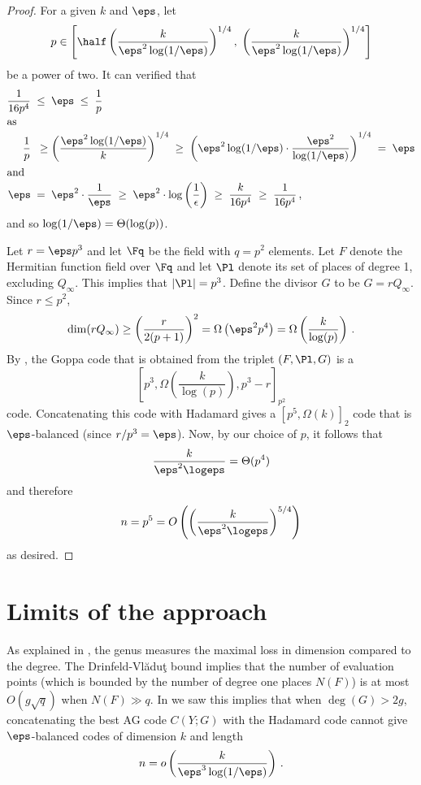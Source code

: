 \begin{proof}
For a given $k$ and $\eps$, let $$p \in \left[\half
\left(\frac{k}{\eps^2 \log(1/\eps)}\right)^{1/4}, \;
\left(\frac{k}{\eps^2 \log(1/\eps)}\right)^{1/4}\right]$$ be a power
of two. It can verified that 
\begin{align*}
\frac{1}{16p^4}\; &\le\; \eps \;\le\;
\frac{1}{p}\\
\intertext{as}
  \frac{1}{p} \;&\;\ge \left(\frac{\eps^2 \log(1/\eps)}{k}\right)^{1/4} \;\ge\;
\left(\eps^2 \log(1/\eps) \cdot \frac{\eps^2}{\log(1/\eps)}\right)^{1/4}
\;=\; \eps\\
\intertext{and}
  \eps \;&=\; \eps^2 \cdot \frac{1}{\eps} \;\ge\; \eps^2 \cdot \log\left(\frac{1}{\epsilon}\right)
\;\ge\; \frac{k}{16 p^4} \;\ge\; \frac{1}{16 p^4}\,,
\end{align*}
and so $\log(1/\eps) = \Theta(\log(p))$.
%
%
%
%
%
%
%

Let $r=\eps p^3$ and let $\Fq $ be the field with $q=p^2$ elements.
Let $F$ denote the Hermitian function field over $\Fq $ and let
$\Pl$ denote its set of places of degree 1, excluding $Q_\infty$.
This implies that $|\Pl| = p^3$. Define the divisor $G$ to be $G =
rQ_\infty$. Since $r \le p^2$,
$$\dim (r Q_\infty) \ge \left(\frac{r}{2(p+1)}\right)^2 = \Omega\left(\eps^2
p^4\right)=\Omega\left(\frac{k}{\log(p)}\right)\,.$$ By
, the Goppa code that is obtained from the
triplet $(F, \Pl, G)$ is a
$$\left[p^3,\Omega\left(\frac{k}{\log(p)}\right),p^3 - r\right]_{p^2}$$ code. Concatenating this code with Hadamard gives a $[p^5,\Omega({k})]_2$ code that is $\eps$-balanced (since
${r}/{p^3}=\eps$). Now, by our choice of $p$, it follows that
$${k \over \eps^2 \logeps} = \Theta(p^4)$$ and therefore 
\[
n=p^5
=O\left(\left(\frac{k}{\eps^2 \logeps}\right)^{5/4}\right)
\]
as desired.
\end{proof}



\section{Limits of the approach}
\label{sec:voloch}

As explained in , the genus measures
the maximal loss in dimension compared to the degree. The
Drinfeld-Vl\u{a}du\c{t} bound implies that the number of evaluation
points (which is bounded by the number of degree one places $N(F)$)
is at most $O(g \sqrt{q})$ when $N(F) \gg q$. In
 we saw this implies that when $\deg(G) >
2g$, concatenating the best AG code $C(Y;G)$ with the Hadamard code
cannot give $\eps$-balanced codes of dimension $k$ and length
\[
n=o\left(\frac{k}{\eps^3 \log(1/\eps)}\right)\,.
\]

